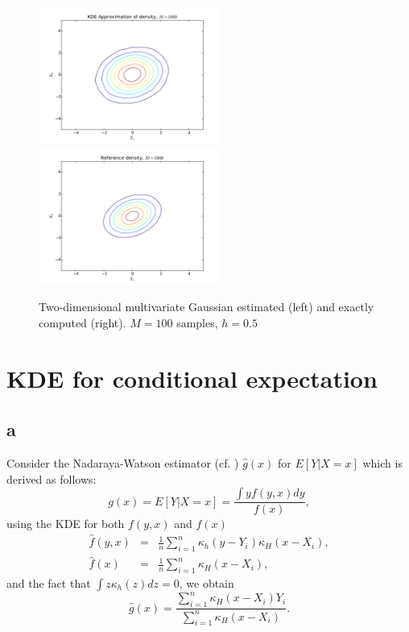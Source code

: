 \documentclass[a4paper,11pt]{article}
\begin{document}
\begin{figure}
\begin{center}
\includegraphics[width=60mm]{./approximation.pdf}
\includegraphics[width=60mm]{./reference.pdf}
\caption{
\label{fig:2ddens}
Two-dimensional multivariate Gaussian estimated (left) and exactly computed (right).
$M=100$ samples, $h=0.5$ 
}
\end{center}
\end{figure}

\section*{KDE for conditional expectation}

\subsection*{a}

Consider the Nadaraya-Watson estimator (cf. \cite{kdecond}) $\hat{g}(x)$ for $E[Y|X=x]$ which is derived as follows:
\begin{equation*}
g(x) = E[Y|X=x] = \frac{\int y f(y,x) dy}{f(x)},
\end{equation*}
using the KDE for both $f(y,x)$ and $f(x)$
\begin{eqnarray*}
\hat{f}(y,x) &=& \frac{1}{n} \sum_{i = 1}^{n} \kappa_{h}(y - Y_i) \kappa_{H}(x - X_i), \\
\hat{f}(x) &=& \frac{1}{n} \sum_{i = 1}^{n} \kappa_{H}(x - X_i),
\end{eqnarray*}
and the fact that $\int z\kappa_{h} (z)dz = 0$, we obtain
\begin{equation*}
\hat{g}(x) = \frac{ \sum_{i = 1}^{n}\kappa_{H}(x - X_i) Y_{i}}{\sum_{i = 1}^{n} \kappa_{H}(x - X_i)}.
\end{equation*}
\end{document}
